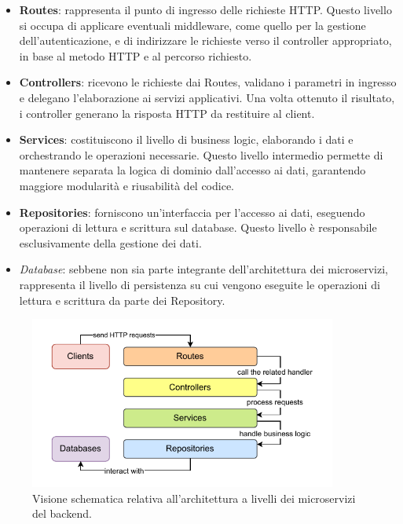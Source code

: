 \begin{itemize}
  \item \textbf{Routes}: rappresenta il punto di ingresso delle richieste HTTP. Questo livello si occupa di applicare eventuali middleware, come quello per la gestione dell'autenticazione, e di indirizzare le richieste verso il controller appropriato, in base al metodo HTTP e al percorso richiesto.
  
  \item \textbf{Controllers}: ricevono le richieste dai Routes, validano i parametri in ingresso e delegano l'elaborazione ai servizi applicativi. Una volta ottenuto il risultato, i controller generano la risposta HTTP da restituire al client.
  
  \item \textbf{Services}: costituiscono il livello di business logic, elaborando i dati e orchestrando le operazioni necessarie. Questo livello intermedio permette di mantenere separata la logica di dominio dall'accesso ai dati, garantendo maggiore modularità e riusabilità del codice.
  
  \item \textbf{Repositories}: forniscono un'interfaccia per l'accesso ai dati, eseguendo operazioni di lettura e scrittura sul database. Questo livello è responsabile esclusivamente della gestione dei dati.
  
  \item \textit{Database}: sebbene non sia parte integrante dell'architettura dei microservizi, rappresenta il livello di persistenza su cui vengono eseguite le operazioni di lettura e scrittura da parte dei Repository.
\end{itemize}

\begin{figure}
  \centering
  \includegraphics[width=0.9\textwidth]{figures/microservice-architecture.pdf}
  \caption{Visione schematica relativa all'architettura a livelli dei microservizi del backend.}
  \label{fig:microservice-architecture}
\end{figure}

